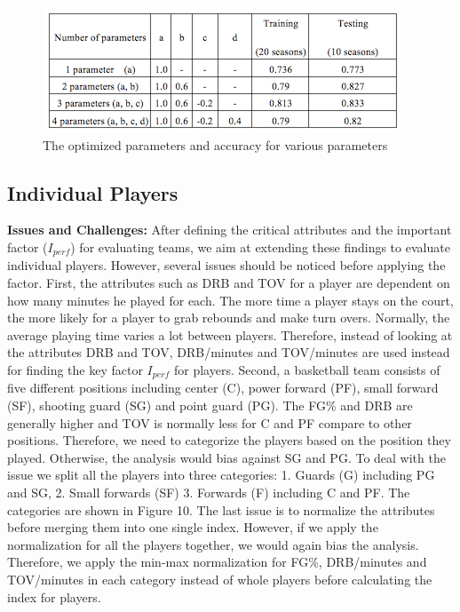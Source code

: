 \documentclass{acm_proc_article-sp}
\begin{document}
\begin{figure}[!htb]
\centering
\includegraphics{Fig-9.png}
\caption{The optimized parameters and accuracy for various parameters}
\end{figure}

\subsection{Individual Players}
\vspace{0.5em}
\textbf{Issues and Challenges:} After defining the critical attributes and the important factor ($I_{perf}$) for evaluating teams, we aim at extending these findings to evaluate individual players.  However, several issues should be noticed before applying the factor. First, the attributes such as DRB and TOV for a player are dependent on how many minutes he played for each. The more time a player stays on the court, the more likely for a player to grab rebounds and make turn overs. Normally, the average playing time varies a lot between players. Therefore, instead of looking at the attributes DRB and TOV, DRB/minutes and TOV/minutes are used instead for finding the key factor $I_{perf}$ for players. Second, a basketball team consists of five different positions including center (C), power forward (PF), small forward (SF), shooting guard (SG) and point guard (PG). The FG\% and DRB are generally higher and TOV is normally less for C and PF compare to other positions. Therefore, we need to categorize the players based on the position they played. Otherwise, the analysis would bias against SG and PG. To deal with the issue we split all the players into three categories: 1. Guards (G) including PG and SG, 2. Small forwards (SF) 3. Forwards (F) including C and PF. The categories are shown in Figure 10. The last issue is to normalize the attributes before merging them into one single index. However, if we apply the normalization for all the players together, we would again bias the analysis. Therefore, we apply the min-max normalization for FG\%, DRB/minutes and TOV/minutes in each category instead of whole players before calculating the index for players. 
\end{document}
